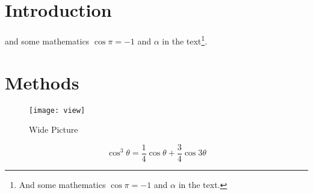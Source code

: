 



\maketitle %

\tableofcontents %

\thispagestyle{empty} %


\section*{Introduction} %


\lipsum[1-3] %
 and some mathematics $\cos\pi=-1$ and $\alpha$ in the text\footnote{And some mathematics $\cos\pi=-1$ and $\alpha$ in the text.}.




\section{Methods}

\begin{figure*}[ht]\centering %
	\texttt{[image: view]}
	\caption{Wide Picture}
	\label{fig:view}
\end{figure*}

\lipsum[4] %

\begin{equation}
	\cos^3 \theta =\frac{1}{4}\cos\theta+\frac{3}{4}\cos 3\theta
	\label{eq:refname2}
\end{equation}

